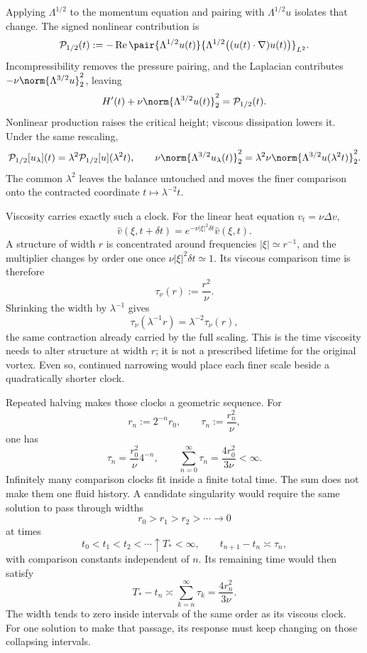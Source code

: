 Applying \(\Lambda^{1/2}\) to the momentum equation and pairing with \(\Lambda^{1/2}u\) isolates that change.
The signed nonlinear contribution is
\[
  \mathcal P_{1/2}(t)
  :=
  -\operatorname{Re}
  \pair
    {\Lambda^{1/2}u(t)}
    {\Lambda^{1/2}\bigl((u(t)\cdot\nabla)u(t)\bigr)}_{L^2}.
\]
Incompressibility removes the pressure pairing, and the Laplacian contributes \(-\nu\norm{\Lambda^{3/2}u}_2^2\), leaving
\[
  H'(t)
  +
  \nu\norm{\Lambda^{3/2}u(t)}_2^2
  =
  \mathcal P_{1/2}(t).
\]
Nonlinear production raises the critical height; viscous dissipation lowers it.
Under the same rescaling,
\[
  \mathcal P_{1/2}[u_\lambda](t)
  =
  \lambda^2\mathcal P_{1/2}[u](\lambda^2t),
  \qquad
  \nu\norm{\Lambda^{3/2}u_\lambda(t)}_2^2
  =
  \lambda^2\nu\norm{\Lambda^{3/2}u(\lambda^2t)}_2^2.
\]
The common \(\lambda^2\) leaves the balance untouched and moves the finer comparison onto the contracted coordinate \(t\mapsto\lambda^{-2}t\).


Viscosity carries exactly such a clock.
For the linear heat equation \(v_t=\nu\Delta v\),
\[
  \widehat v(\xi,t+\delta t)
  =
  e^{-\nu|\xi|^2\delta t}\widehat v(\xi,t).
\]
A structure of width \(r\) is concentrated around frequencies \(|\xi|\simeq r^{-1}\), and the multiplier changes by order one once \(\nu|\xi|^2\delta t\simeq1\).
Its viscous comparison time is therefore
\[
  \tau_\nu(r)
  :=
  \frac{r^2}{\nu}.
\]
Shrinking the width by \(\lambda^{-1}\) gives
\[
  \tau_\nu(\lambda^{-1}r)
  =
  \lambda^{-2}\tau_\nu(r),
\]
the same contraction already carried by the full \NavierStokes{} scaling.
This is the time viscosity needs to alter structure at width \(r\); it is not a prescribed lifetime for the original vortex.
Even so, continued narrowing would place each finer scale beside a quadratically shorter clock.


Repeated halving makes those clocks a geometric sequence.
For
\[
  r_n:=2^{-n}r_0,
  \qquad
  \tau_n:=\frac{r_n^2}{\nu},
\]
one has
\[
  \tau_n
  =
  \frac{r_0^2}{\nu}4^{-n},
  \qquad
  \sum_{n=0}^{\infty}\tau_n
  =
  \frac{4r_0^2}{3\nu}
  <
  \infty.
\]
Infinitely many comparison clocks fit inside a finite total time.
The sum does not make them one fluid history.
A candidate singularity would require the same solution to pass through widths
\[
  r_0>r_1>r_2>\cdots\longrightarrow0
\]
at times
\[
  t_0<t_1<t_2<\cdots\uparrow T_*<\infty,
  \qquad
  t_{n+1}-t_n\asymp\tau_n,
\]
with comparison constants independent of \(n\).
Its remaining time would then satisfy
\[
  T_*-t_n
  \asymp
  \sum_{k=n}^{\infty}\tau_k
  =
  \frac{4r_n^2}{3\nu}.
\]
The width tends to zero inside intervals of the same order as its viscous clock.
For one solution to make that passage, its response must keep changing on those collapsing intervals.

